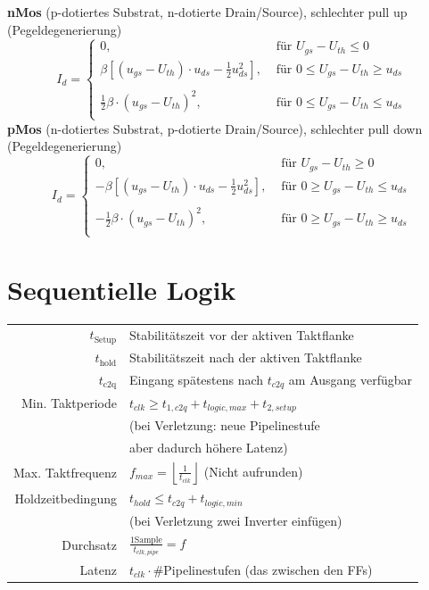 \documentclass[english]{latex4ei/latex4ei_sheet}
\begin{document}
\textbf{nMos} (p-dotiertes Substrat, n-dotierte Drain/Source), schlechter pull up (Pegeldegenerierung)
\begin{equation*}
\!\!\! I_d = \begin{cases}
0, &\text{ für }  U_{gs} - U_{th} \le 0\\[0.2em]
\beta [(u_{gs} - U_{th}) \cdot u_{ds} - \frac{1}{2} u_{ds}^2] , &\text{ für }  0 \le U_{gs} - U_{th} \ge u_{ds}\\\\[0.2em]
\frac{1}{2} \beta \cdot (u_{gs} - U_{th})^2, &\text{ für }  0 \le U_{gs} - U_{th} \le u_{ds}\\
\end{cases}
\end{equation*}
\textbf{pMos} (n-dotiertes Substrat, p-dotierte Drain/Source), schlechter pull down (Pegeldegenerierung)
\begin{equation*}
\!\!\! I_d = \begin{cases}
0, &\text{ für }  U_{gs} - U_{th} \ge 0\\[0.2em]
- \beta [(u_{gs} - U_{th}) \cdot u_{ds} - \frac{1}{2} u_{ds}^2] , &\text{ für }  0 \ge U_{gs} - U_{th} \le u_{ds}\\\\[0.2em]
- \frac{1}{2} \beta \cdot (u_{gs} - U_{th})^2, &\text{ für }  0 \ge U_{gs} - U_{th} \ge u_{ds}\\

\end{cases}
\end{equation*}

\section{Sequentielle Logik}

\begin{tabular}{rl}
	$t_{\text{Setup}}$ & Stabilitätszeit vor der aktiven Taktflanke\\
	$t_{\text{hold}}$ & Stabilitätszeit nach  der aktiven Taktflanke\\
	$t_{\text{c2q}}$ & Eingang spätestens nach $t_{c2q}$ am Ausgang verfügbar\\
	Min. Taktperiode &  $t_{clk} \ge t_{1,c2q} + t_{logic,max} + t_{2,setup}$ \\
	 & (bei Verletzung: neue Pipelinestufe\\
	 & aber dadurch höhere Latenz) \\
	Max. Taktfrequenz & $f_{max} = \left\lfloor \frac{1}{t_{clk}} \right\rfloor$ \qquad (Nicht aufrunden) \\
	Holdzeitbedingung & $t_{hold} \le t_{c2q} + t_{logic,min}$\\
	 & (bei Verletzung zwei Inverter einfügen)\\
	Durchsatz & $\frac{1 \text{Sample}}{t_{clk,pipe}} = f$ \\
	Latenz & $t_{clk} \cdot \#$Pipelinestufen (das zwischen den FFs) \\
\end{tabular}
\end{document}
